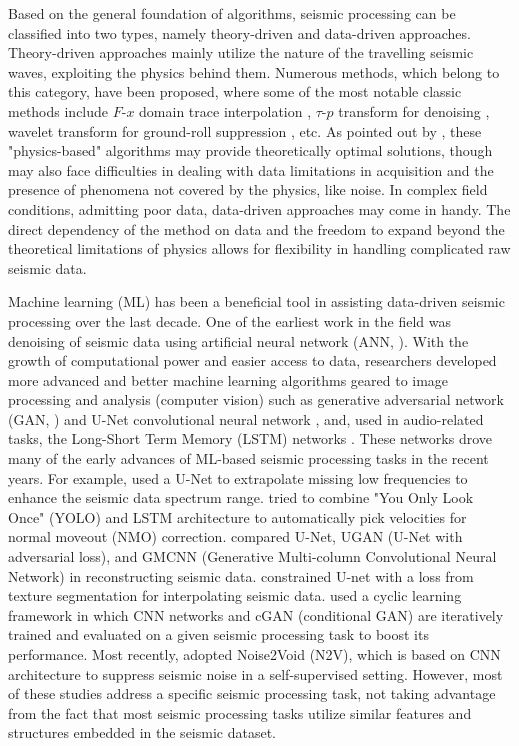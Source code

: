 \documentclass{article}
\begin{document}
Based on the general foundation of algorithms, seismic processing can be classified into two types, namely theory-driven and data-driven approaches. Theory-driven approaches mainly utilize the nature of the travelling seismic waves, exploiting the physics behind them. Numerous methods, which belong to this category, have been proposed, where some of the most notable classic methods include $F$-$x$ domain trace interpolation \cite{spitz1991seismic}, $\tau$-$p$ transform for denoising \cite{turner1990aliasing}, wavelet transform for ground-roll suppression \cite{deighan1997ground}, etc. As pointed out by \cite{hou2021machine}, these "physics-based" algorithms may provide theoretically optimal solutions, though may also face difficulties in dealing with data limitations in acquisition and the presence of phenomena not covered by the physics, like noise. In complex field conditions, admitting poor data, data-driven approaches may come in handy. The direct dependency of the method on data and the freedom to expand beyond the theoretical limitations of physics \cite{sun2020ml} allows for flexibility in handling complicated raw seismic data.

Machine learning (ML) has been a beneficial tool in assisting data-driven seismic processing over the last decade. One of the earliest work in the field was denoising of seismic data using artificial neural network (ANN, \cite{zhang2010seismic}). With the growth of computational power and easier access to data, researchers developed more advanced and better machine learning algorithms geared to image processing and analysis (computer vision) such as generative adversarial network (GAN, \cite{goodfellow2014generative}) and U-Net convolutional neural network \cite{ronneberger2015u}, and, used in audio-related tasks, the Long-Short Term Memory (LSTM) networks \cite{sak2014long}. These networks drove many of the early advances of ML-based seismic processing tasks in the recent years. For example, \cite{ovcharenko2019deep} used a U-Net to extrapolate missing low frequencies to enhance the seismic data spectrum range. \cite{zhang2019automatic} tried to combine "You Only Look Once" (YOLO) and LSTM architecture to automatically pick velocities for normal moveout (NMO) correction. \cite{ovcharenko2020deep} compared U-Net, UGAN (U-Net with adversarial loss), and GMCNN (Generative Multi-column Convolutional Neural Network) in reconstructing seismic data. \cite{fang2021seismic} constrained U-net with a loss from texture segmentation for interpolating seismic data. \cite{borges2021cyclic} used a cyclic learning framework in which CNN networks and cGAN (conditional GAN) are iteratively trained and evaluated on a given seismic processing task to boost its performance. Most recently, \cite{birnie2021potential} adopted Noise2Void (N2V), which is based on CNN architecture to suppress seismic noise in a self-supervised setting. However, most of these studies address a specific seismic processing task, not taking advantage from the fact that most seismic processing tasks utilize similar features and structures embedded in the seismic dataset.
\end{document}
